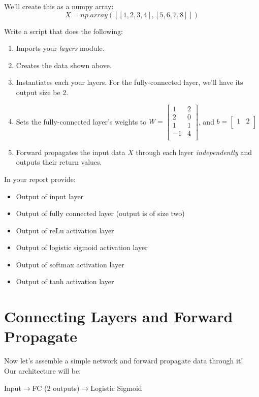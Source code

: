 \documentclass[12pt]{article}
\begin{document}
\noindent
We'll create this as a numpy array:
$$X = np.array([[1, 2, 3, 4], [5, 6, 7, 8]])$$

\noindent
Write a script that does the following:
\begin{enumerate}
\item Imports your \emph{layers} module.
\item Creates the data shown above.
\item Instantiates each your layers.  For the fully-connected layer, we'll have its output size be $2$.
\item Sets the fully-connected layer's weights to $W = \begin{bmatrix}
1 & 2 \\
2& 0\\
1 & 1\\
-1 & 4\\
\end{bmatrix}$, and $b = \begin{bmatrix}
1 & 2\\
\end{bmatrix}$
\item Forward propagates the input data $X$ through each layer \emph{independently} and outputs their return values.
\end{enumerate}


\noindent
In your report provide:
\begin{itemize}
\item Output of input layer
\item Output of fully connected layer (output is of size two)
\item Output of reLu activation layer
\item Output of logistic sigmoid activation layer
\item Output of softmax activation layer
\item Output of tanh activation layer

\end{itemize}

\newpage
\section{Connecting Layers and Forward Propagate}
Now let's assemble a simple network and forward propagate data through it!\\

\noindent
Our architecture will be:\\
\begin{center}
Input$\rightarrow$FC (2 outputs)$\rightarrow$Logistic Sigmoid
\end{center}
\end{document}

